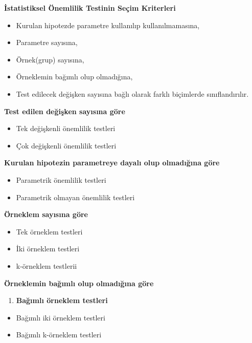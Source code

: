 \documentclass[
]{article}
\providecommand{\tightlist}{%
  \setlength{\itemsep}{0pt}\setlength{\parskip}{0pt}}
\begin{document}
\textbf{İstatistiksel Önemlilik Testinin Seçim Kriterleri}

\begin{itemize}
\tightlist
\item
  Kurulan hipotezde parametre kullanılıp kullanılmamasına,
\item
  Parametre sayısına,
\item
  Örnek(grup) sayısına,
\item
  Örneklemin bağımlı olup olmadığına,
\item
  Test edilecek değişken sayısına bağlı olarak farklı biçimlerde
  sınıflandırılır.
\end{itemize}

\textbf{Test edilen değişken sayısına göre}

\begin{itemize}
\tightlist
\item
  Tek değişkenli önemlilik testleri
\item
  Çok değişkenli önemlilik testleri
\end{itemize}

\textbf{Kurulan hipotezin parametreye dayalı olup olmadığına göre}

\begin{itemize}
\tightlist
\item
  Parametrik önemlilik testleri
\item
  Parametrik olmayan önemlilik testleri
\end{itemize}

\textbf{Örneklem sayısına göre}

\begin{itemize}
\tightlist
\item
  Tek örneklem testleri
\item
  İki örneklem testleri
\item
  k-örneklem testlerii
\end{itemize}

\textbf{Örneklemin bağımlı olup olmadığına göre}

\begin{enumerate}
\def\labelenumi{\arabic{enumi}.}
\tightlist
\item
  \textbf{Bağımlı örneklem testleri}
\end{enumerate}

\begin{itemize}
\tightlist
\item
  Bağımlı iki örneklem testleri
\item
  Bağımlı k-örneklem testleri
\end{itemize}
\end{document}
